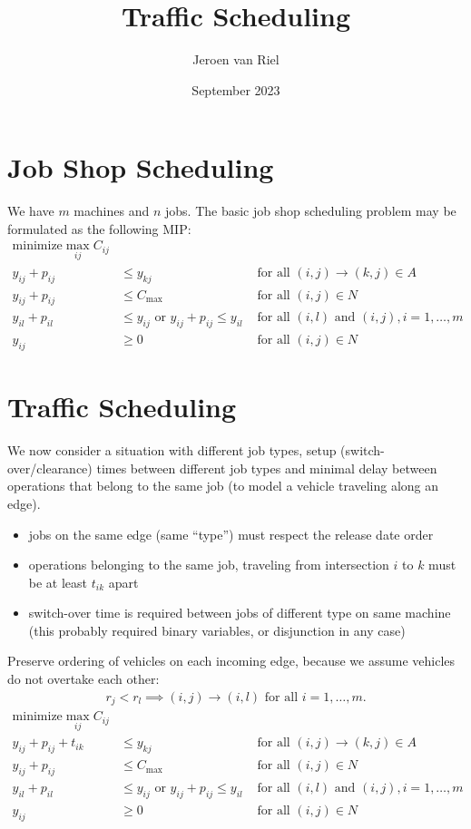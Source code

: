 \documentclass{article}
\title{Traffic Scheduling}
\author{Jeroen van Riel}
\date{September 2023}
\begin{document}
\maketitle

\section{Job Shop Scheduling}
We have $m$ machines and $n$ jobs. The basic job shop scheduling problem may be
formulated as the following MIP:
\begin{align*}
  \text{minimize} \max_{ij} C_{ij} \\
  y_{ij} + p_{ij} &\leq y_{kj}  & \text{ for all } (i,j) \xrightarrow{} (k,j) \in A \\
  y_{ij} + p_{ij} &\leq C_{\text{max}} & \text{ for all } (i,j) \in N \\
  y_{il} + p_{il} &\leq  y_{ij} \text{ or } y_{ij} + p_{ij} \leq y_{il}  & \text{ for all } (i,l) \text{ and } (i,j), i =1, \dots,m \\
  y_{ij} &\geq 0 & \text{ for all } (i,j) \in N
\end{align*}


\section{Traffic Scheduling}
We now consider a situation with different job types, setup
(switch-over/clearance) times between different job types and minimal delay
between operations that belong to the same job (to model a vehicle traveling
along an edge).
%
\begin{itemize}
  \item jobs on the same edge (same ``type'') must respect the release date order
  \item operations belonging to the same job, traveling from intersection $i$ to $k$ must be at least $t_{ik}$ apart
  \item switch-over time is required between jobs of different type on same machine (this probably required binary variables, or disjunction in any case)
\end{itemize}
%
Preserve ordering of vehicles on each incoming edge, because we assume vehicles do not overtake each other:
\begin{align*}
  r_{j} < r_{l} \implies (i,j) \rightarrow{} (i,l) \text{ for all } i = 1,\dots,m .
\end{align*}
%
\begin{align*}
  \text{minimize} \max_{ij} C_{ij} \\
  y_{ij} + p_{ij} + t_{ik} &\leq y_{kj}  & \text{ for all } (i,j) \xrightarrow{} (k,j) \in A \\
  y_{ij} + p_{ij} &\leq C_{\text{max}} & \text{ for all } (i,j) \in N \\
  y_{il} + p_{il} &\leq  y_{ij} \text{ or } y_{ij} + p_{ij} \leq y_{il}  & \text{ for all } (i,l) \text{ and } (i,j), i =1, \dots,m \\
  y_{ij} &\geq 0 & \text{ for all } (i,j) \in N \\
\end{align*}
\end{document}

